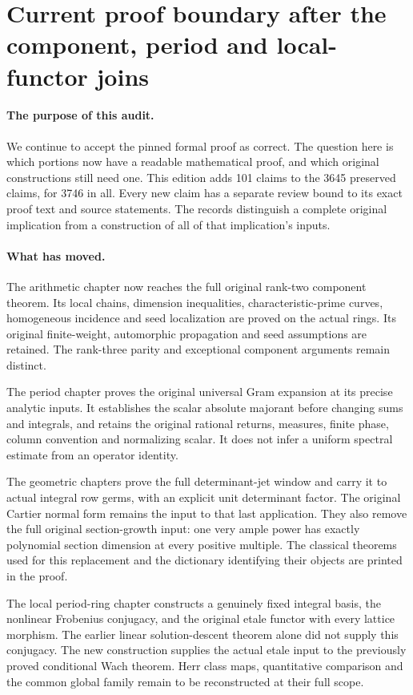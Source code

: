 \section{Current proof boundary after the component, period and local-functor joins}
\label{sec:dependency-audit-v57}

\paragraph{The purpose of this audit.}
We continue to accept the pinned formal proof as correct.  The question
here is which portions now have a readable mathematical proof, and which
original constructions still need one.  This edition adds 101 claims
to the 3645 preserved claims, for 3746 in all.  Every new claim has
a separate review bound to its exact proof text and source statements.
The records distinguish a complete original implication from a construction
of all of that implication's inputs.

\paragraph{What has moved.}
The arithmetic chapter now reaches the full original rank-two component
theorem.  Its local chains, dimension inequalities, characteristic-prime
curves, homogeneous incidence and seed localization are proved on the
actual rings.  Its original finite-weight, automorphic propagation and
seed assumptions are retained.  The rank-three parity and exceptional
component arguments remain distinct.

The period chapter proves the original universal Gram expansion at its
precise analytic inputs.  It establishes the scalar absolute majorant
before changing sums and integrals, and retains the original rational
returns, measures, finite phase, column convention and normalizing scalar.
It does not infer a uniform spectral estimate from an operator identity.

The geometric chapters prove the full determinant-jet window and carry it
to actual integral row germs, with an explicit unit determinant factor.
The original Cartier normal form remains the input to that last
application.  They also remove the full original section-growth input:
one very ample power has exactly polynomial section dimension at every
positive multiple.  The classical theorems used for this replacement and
the dictionary identifying their objects are printed in the proof.

The local period-ring chapter constructs a genuinely fixed integral basis,
the nonlinear Frobenius conjugacy, and the original etale functor with
every lattice morphism.  The earlier linear solution-descent theorem
alone did not supply this conjugacy.  The new construction supplies the
actual etale input to the previously proved conditional Wach theorem.
Herr class maps, quantitative comparison and the common global family
remain to be reconstructed at their full scope.

